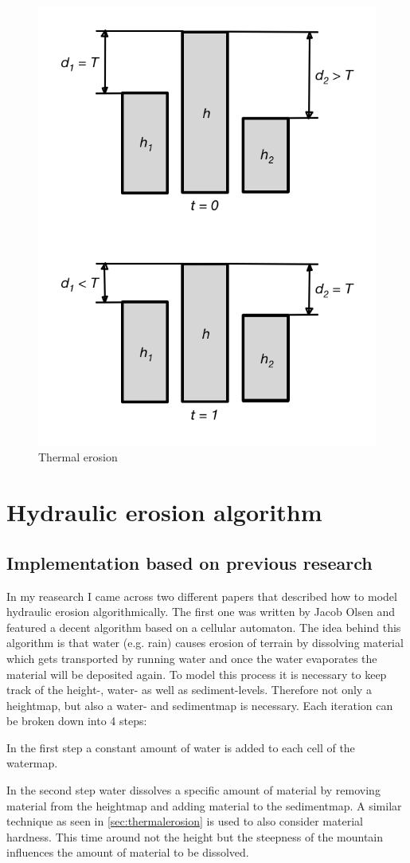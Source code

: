 \documentclass[11pt,a4paper,twoside,openright]{report}
\begin{document}
\begin{figure}[h]
\centering
\includegraphics[width=0.5\linewidth]{thermalerosion.png}
\caption{Thermal erosion}\label{fig:thermalerosion}
\end{figure}

\section{Hydraulic erosion algorithm}
\label{sec:hydraulicerosion}
\subsection{Implementation based on previous research}
In my reasearch I came across two different papers that described how to model hydraulic erosion algorithmically. The first one \cite{Olsen:2004} was written by Jacob Olsen and featured a decent algorithm based on a cellular automaton. The idea behind this algorithm is that water (e.g. rain) causes erosion of terrain by dissolving material which gets transported by running water and once the water evaporates the material will be deposited again. To model this process it is necessary to keep track of the height-, water- as well as sediment-levels. Therefore not only a heightmap, but also a water- and sedimentmap is necessary. Each iteration can be broken down into 4 steps:

In the first step a constant amount of water is added to each cell of the watermap.

In the second step water dissolves a specific amount of material by removing material from the heightmap and adding material to the sedimentmap. A similar technique as seen in \cref{sec:thermalerosion} is used to also consider material hardness. This time around not the height but the steepness of the mountain influences the amount of material to be dissolved.
\end{document}
